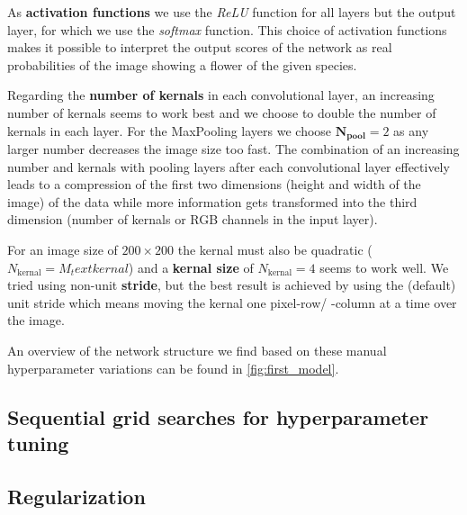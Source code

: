 As \textbf{activation functions} we use the \textit{ReLU} function for all layers but the output layer, for which we use the \textit{softmax} function.
This choice of activation functions makes it possible to interpret the output scores of the network as real probabilities of the image showing a flower of the given species.

Regarding the \textbf{number of kernals} in each convolutional layer, an increasing number of kernals seems to work best and we choose to double the number of kernals in each layer.
For the MaxPooling layers we choose $\symbf{N_\text{pool}} = 2$ as any larger number decreases the image size too fast.
The combination of an increasing number and kernals with pooling layers after each convolutional layer effectively leads to a compression of the first two dimensions (height and width of the image) 
of the data while more information gets transformed into the third dimension (number of kernals or RGB channels in the input layer).

For an image size of $200\times 200$ the kernal must also be quadratic ($N_\text{kernal} = M_text{kernal}$) and a \textbf{kernal size} of $N_\text{kernal} = 4$ seems to work well.
We tried using non-unit \textbf{stride}, but the best result is achieved by using the (default) unit stride which means moving the kernal one pixel-row/ -column at a time over the image.

An overview of the network structure we find based on these manual hyperparameter variations can be found in \autoref{fig:first_model}. 



\subsection{Sequential grid searches for hyperparameter tuning}


\subsection{Regularization}

